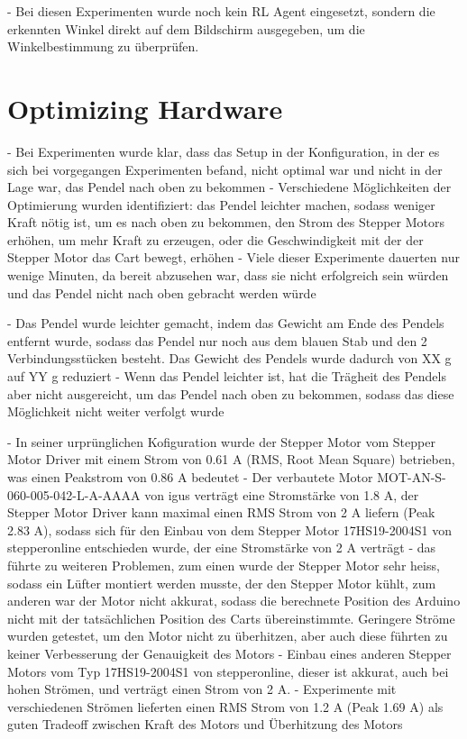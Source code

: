 - Bei diesen Experimenten wurde noch kein RL Agent eingesetzt, sondern die erkennten Winkel direkt auf dem Bildschirm ausgegeben, um die Winkelbestimmung zu überprüfen.

\section{Optimizing Hardware}
- Bei Experimenten wurde klar, dass das Setup in der Konfiguration, in der es sich bei vorgegangen Experimenten befand, nicht optimal war und nicht in der Lage war, das Pendel nach oben zu bekommen
- Verschiedene Möglichkeiten der Optimierung wurden identifiziert: das Pendel leichter machen, sodass weniger Kraft nötig ist, um es nach oben zu bekommen, den Strom des Stepper Motors erhöhen, um mehr Kraft zu erzeugen, oder die Geschwindigkeit mit der der Stepper Motor das Cart bewegt, erhöhen
- Viele dieser Experimente dauerten nur wenige Minuten, da bereit abzusehen war, dass sie nicht erfolgreich sein würden und das Pendel nicht nach oben gebracht werden würde

- Das Pendel wurde leichter gemacht, indem das Gewicht am Ende des Pendels entfernt wurde, sodass das Pendel nur noch aus dem blauen Stab und den 2 Verbindungsstücken besteht. Das Gewicht des Pendels wurde dadurch von XX g auf YY g reduziert %
- Wenn das Pendel leichter ist, hat die Trägheit des Pendels aber nicht ausgereicht, um das Pendel nach oben zu bekommen, sodass das diese Möglichkeit nicht weiter verfolgt wurde

- In seiner urprünglichen Kofiguration wurde der Stepper Motor vom Stepper Motor Driver mit einem Strom von 0.61 A (RMS, Root Mean Square) betrieben, was einen Peakstrom von 0.86 A bedeutet
- Der verbautete Motor MOT-AN-S-060-005-042-L-A-AAAA von igus verträgt eine Stromstärke von 1.8 A, der Stepper Motor Driver kann maximal einen RMS Strom von 2 A liefern (Peak 2.83 A), sodass sich für den Einbau von dem Stepper Motor 17HS19-2004S1 von stepperonline entschieden wurde, der eine Stromstärke von 2 A verträgt
- das führte zu weiteren Problemen, zum einen wurde der Stepper Motor sehr heiss, sodass ein Lüfter montiert werden musste, der den Stepper Motor kühlt, zum anderen war der Motor nicht akkurat, sodass die berechnete Position des Arduino nicht mit der tatsächlichen Position des Carts übereinstimmte. Geringere Ströme wurden getestet, um den Motor nicht zu überhitzen, aber auch diese führten zu keiner Verbesserung der Genauigkeit des Motors
- Einbau eines anderen Stepper Motors vom Typ 17HS19-2004S1 von stepperonline, dieser ist akkurat, auch bei hohen Strömen, und verträgt einen Strom von 2 A. 
- Experimente mit verschiedenen Strömen lieferten einen RMS Strom von 1.2 A (Peak 1.69 A) als guten Tradeoff zwischen Kraft des Motors und Überhitzung des Motors

